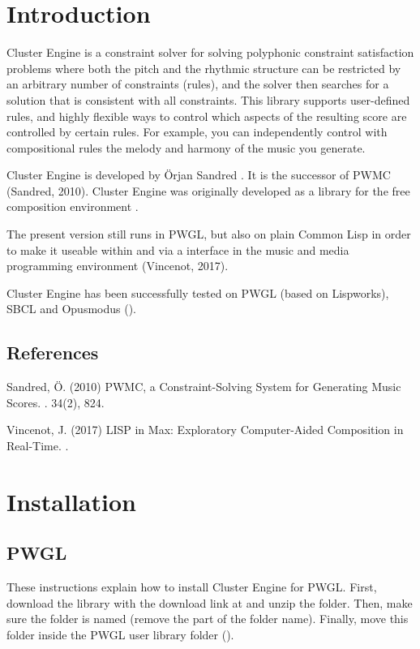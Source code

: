 \documentclass[letterpaper,10pt,english]{sphinxmanual}
\begin{document}
\section{Introduction}
\label{\detokenize{readme:introduction}}
Cluster Engine is a constraint solver for solving polyphonic constraint satisfaction problems where both the pitch and the rhythmic structure can be restricted by an arbitrary number of constraints (rules), and the solver then searches for a solution that is consistent with all constraints. This library supports user-defined rules, and highly flexible ways to control which aspects of the resulting score are controlled by certain rules. For example, you can independently control with compositional rules the melody and harmony of the music you generate.

Cluster Engine is developed by Örjan Sandred . It is the successor of PWMC (Sandred, 2010). Cluster Engine was originally developed as a library for the free composition environment .

The present version still runs in PWGL, but also on plain Common Lisp in order to make it useable within  and \textendash{} via a  interface \textendash{} in the music and media programming environment  (Vincenot, 2017).

Cluster Engine has been successfully tested on PWGL (based on Lispworks), SBCL and Opusmodus ().


\subsection{References}
\label{\detokenize{readme:references}}
Sandred, Ö. (2010) PWMC, a Constraint-Solving System for Generating Music Scores. . 34(2), 8\textendash{}24.

Vincenot, J. (2017) LISP in Max: Exploratory Computer-Aided Composition in Real-Time. .


\section{Installation}
\label{\detokenize{readme:installation}}

\subsection{PWGL}
\label{\detokenize{readme:id1}}
These instructions explain how to install Cluster Engine for PWGL. First, download the library with the download link at  and unzip the folder. Then, make sure the folder is named  (remove the  part of the folder name). Finally, move this folder inside the PWGL user library folder ().
\end{document}
